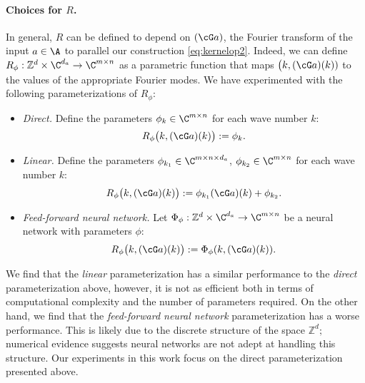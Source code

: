 

\paragraph{Choices for $R$.} In general, $R$ can be defined to depend on $(\cG a)$, the Fourier transform of the input \(a \in \A\) to parallel our construction \eqref{eq:kernelop2}.
Indeed, we can define $R_\phi: \mathbb{Z}^d \times \C^{d_a} \to \C^{m \times n}$
as a parametric function that maps \(\bigl(k,(\cG a)(k))\) to the values of the appropriate Fourier modes. We have experimented with the following parameterizations of $R_\phi$:
\begin{itemize}
    \item \textit{Direct. } Define the parameters $\phi_k \in \C^{m \times n }$ for each wave number $k$:
    \[ R_\phi \bigl(k,(\cG a)(k)\bigr) := \phi_k.\]
    \item \textit{Linear. } Define the parameters \(\phi_{k_1} \in \C^{m \times n \times d_a}\), \(\phi_{k_2} \in \C^{m \times n}\) for each wave number $k$:
    \[R_\phi \bigl(k,(\cG a)(k)\bigr) := \phi_{k_1} (\cG a)(k) + \phi_{k_2}.\]
    \item \textit{Feed-forward neural network.}
    Let $\Phi_\phi:  \mathbb{Z}^d \times \C^{d_a} \to \C^{m \times n}$ be a neural network with parameters $\phi$:
    \[R_\phi \bigl(k,(\cG a)(k)\bigr) := \Phi_\phi(k, (\cG a)(k)). \]
\end{itemize}
We find that the \textit{linear} parameterization has a similar performance to the \textit{direct} parameterization above, 
however, it is not as efficient both in terms of computational complexity and the number of parameters required.
On the other hand, we find that the \textit{feed-forward neural network} parameterization has a worse performance.  This is likely due to the discrete structure of the space $\mathbb{Z}^d;$ numerical evidence suggests neural networks are not adept at handling this structure. Our experiments in this work focus on the direct parameterization presented above.

